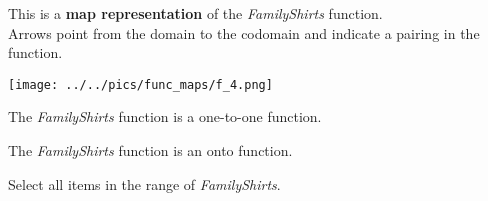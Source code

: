 \documentclass{ximera}
\author{Lee Wayand}
\begin{document}
\begin{exercise}

This is a \textbf{map representation} of the \textit{FamilyShirts} function. \\


Arrows point from the domain to the codomain and indicate a pairing in the function.


\begin{image}
\texttt{[image: ../../pics/func\_maps/f\_4.png]}
\end{image}




\begin{question} 
The \textit{FamilyShirts} function is a one-to-one function.

\begin{multipleChoice}
\end{multipleChoice}
\end{question}







\begin{question} 
The \textit{FamilyShirts} function is an onto function.

\begin{multipleChoice}
\end{multipleChoice}
\end{question}







\begin{question} 

Select all items in the range of \textit{FamilyShirts}.

\begin{selectAll}
\end{selectAll}
\end{question}












\end{exercise}
\end{document}
